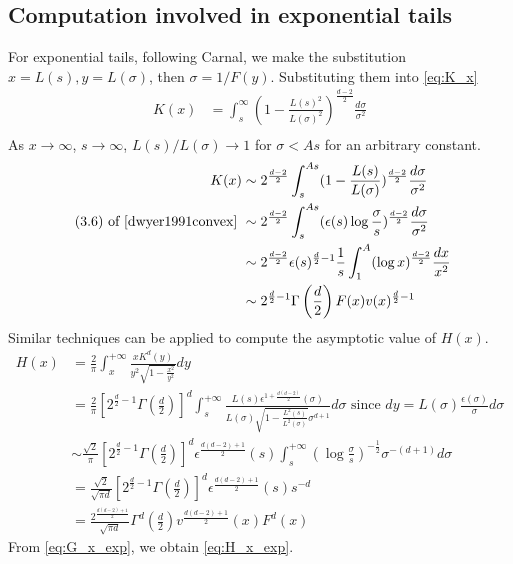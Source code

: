 \documentclass{aptpub}
\begin{document}
\subsection{Computation involved in exponential tails}
For exponential tails, following Carnal, we make
the substitution $x=L(s), y=L(\sigma)$, then $\sigma=1/F(y)$.
Substituting them into \eqref{eq:K_x}
\begin{align*}
    K(x)  & = \int_s^{\infty} (1-\frac{L(s)^2}{L(\sigma)^2})^{\frac{d-2}{2}} \frac{d\sigma}{\sigma^2} \\
\end{align*}
As $x\to \infty$, $s\to \infty$, $L(s)/L(\sigma) \to 1$ for $\sigma <As$
for an arbitrary constant.
\begin{align*}
     K(x)& \sim 2^{\frac{d-2}{2}} 
     \int_s^{As} (1-\frac{L(s)}{L(\sigma)})^{\frac{d-2}{2}}
     \frac{d\sigma}{\sigma^2} \\
     \textrm{ (3.6) of \cite{dwyer1991convex} }& 
     \sim  2^{\frac{d-2}{2}}  \int_s^{As} (\epsilon(s) \log\frac{\sigma}{s})^{\frac{d-2}{2}}\frac{d\sigma}{\sigma^2}\\
     &\sim 2^{\frac{d-2}{2}} \epsilon(s)^{\frac{d}{2}-1} \frac{1}{s} \int_1^{A} (\log x )^{\frac{d-2}{2}}\frac{dx}{x^2}\\
     & \sim 2^{\frac{d}{2}-1} \Gamma\left(\frac{d}{2}\right)F(x) v(x)^{\frac{d}{2}-1}    
\end{align*}
Similar techniques can be applied to compute the asymptotic value of $H(x)$.
\begin{align*}
    H(x) & = \frac{2}{\pi} \int_x^{+\infty}\frac{x K^d(y)}{y^2 \sqrt{1-\frac{x^2}{y^2}}}dy\\
    &=\frac{2}{\pi}\left[2^{\frac{d}{2}-1} \Gamma\left(\frac{d}{2}\right)\right]^d
    \int_s^{+\infty}\frac{L(s) \epsilon^{1+\frac{d(d-2)}{2}}(\sigma)}{L(\sigma) \sqrt{1-\frac{L^2(s)}{L^2(\sigma)}}\sigma^{d+1}} d\sigma
    \textrm{ since } dy=L(\sigma)\frac{\epsilon(\sigma)}{\sigma}d\sigma \\
    &\sim  \frac{\sqrt{2}}{\pi}
    \left[2^{\frac{d}{2}-1} \Gamma\left(\frac{d}{2}\right)\right]^d
    \epsilon^{\frac{d(d-2)+1}{2}}(s)
    \int_s^{+\infty} \left(\log\frac{\sigma}{s}
    \right)^{-\frac{1}{2}}
    \sigma^{-(d+1)}d\sigma \\
    &= \frac{\sqrt{2}}{\sqrt{\pi d}}\left[2^{\frac{d}{2}-1} \Gamma\left(\frac{d}{2}\right)\right]^d
    \epsilon^{\frac{d(d-2)+1}{2}}(s)s^{-d}\\
    &= \frac{2^{\frac{d(d-2)+1}{2}}}{\sqrt{\pi d}}\Gamma^d\left(\frac{d}{2}\right)
    v^{\frac{d(d-2)+1}{2}}(x)F^d(x)
\end{align*}
From \eqref{eq:G_x_exp}, we obtain \eqref{eq:H_x_exp}.
\end{document}
